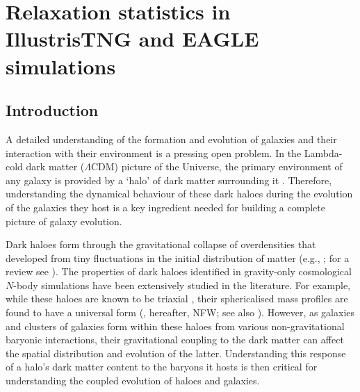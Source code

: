 \chapter{Relaxation statistics in IllustrisTNG and EAGLE simulations}
\section{Introduction}
\label{sec:intro-ch:z0main}
\noindent
A detailed understanding of the formation and evolution of galaxies and their interaction with their environment is a pressing open problem. 
In the Lambda-cold dark matter ($\Lambda$CDM) picture of the Universe, the primary environment of any galaxy is provided by a `halo' of dark matter surrounding it \citep[e.g.,][]{wr78}. 
Therefore, understanding the dynamical behaviour of these dark haloes during the evolution of the galaxies they host is a key ingredient needed for building a complete picture of galaxy evolution.

Dark haloes form through the gravitational collapse of overdensities that developed from tiny fluctuations in the initial distribution of matter (e.g., \citealp[][]{1974ApJ...187..425P}; for a review see \citealp{2002PhR...372....1C}). 
The properties of dark haloes identified in gravity-only cosmological $N$-body simulations have been extensively studied in the literature. For example, while these haloes are known to be triaxial \citep[][]{1988ApJ...327..507F}, their sphericalised mass profiles are found to have a universal form (\citealp{1996ApJ...462..563N,1997ApJ...490..493N}, hereafter, NFW; see also \citealp{2010MNRAS.402...21N}). 
However, as galaxies and clusters of galaxies form within these haloes from various non-gravitational baryonic interactions, their gravitational coupling to the dark matter can affect the spatial distribution and evolution of the latter. Understanding this response of a halo's dark matter content to the baryons it hosts is then critical for understanding the coupled evolution of haloes and galaxies. 


